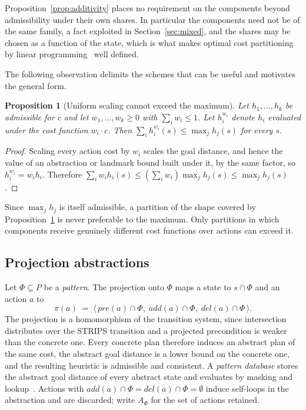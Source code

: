 \documentclass[10pt,twocolumn,a4paper]{article}
\theoremstyle{plain}
\newtheorem{proposition}[theorem]{Proposition}
\theoremstyle{definition}
\theoremstyle{remark}
\newcommand{\pre}{\mathit{pre}}
\newcommand{\add}{\mathit{add}}
\newcommand{\del}{\mathit{del}}
\newcommand{\proj}{\pi}
\begin{document}
Proposition~\ref{prop:additivity} places no requirement on the components
beyond admissibility under their own shares. In particular the components need
not be of the same family, a fact exploited in Section~\ref{sec:mixed}, and the
shares may be chosen as a function of the state, which is what makes optimal
cost partitioning by linear programming~\cite{katz2008,pommerening2014} well
defined.

The following observation delimits the schemes that can be useful and motivates
the general form.

\begin{proposition}[Uniform scaling cannot exceed the maximum]
\label{prop:scaling}
Let $h_1, \dots, h_k$ be admissible for $c$ and let $w_1, \dots, w_k \ge 0$
with $\sum_i w_i \le 1$. Let $h_i^{w_i}$ denote $h_i$ evaluated under the cost
function $w_i \cdot c$. Then
$\sum_i h_i^{w_i}(s) \le \max_j h_j(s)$ for every $s$.
\end{proposition}

\begin{proof}
Scaling every action cost by $w_i$ scales the goal distance, and hence the
value of an abstraction or landmark bound built under it, by the same factor,
so $h_i^{w_i} = w_i h_i$. Therefore
$\sum_i w_i h_i(s) \le (\sum_i w_i) \max_j h_j(s) \le \max_j h_j(s)$.
\end{proof}

Since $\max_j h_j$ is itself admissible, a partition of the shape covered by
Proposition~\ref{prop:scaling} is never preferable to the maximum. Only
partitions in which components receive genuinely different cost functions over
actions can exceed it.

\subsection{Projection abstractions}

Let $\Phi \subseteq P$ be a \emph{pattern}. The projection onto $\Phi$ maps a
state to $s \cap \Phi$ and an action $a$ to
\[
  \proj(a) \;=\; \langle\, \pre(a) \cap \Phi,\; \add(a) \cap \Phi,\;
                          \del(a) \cap \Phi \,\rangle .
\]
The projection is a homomorphism of the transition system, since intersection
distributes over the STRIPS transition and a projected precondition is weaker
than the concrete one. Every concrete plan therefore induces an abstract plan
of the same cost, the abstract goal distance is a lower bound on the concrete
one, and the resulting heuristic is admissible and consistent. A \emph{pattern
database} stores the abstract goal distance of every abstract state and
evaluates by masking and lookup~\cite{culberson1998,edelkamp2001}. Actions
with $\add(a) \cap \Phi = \del(a) \cap \Phi = \emptyset$ induce self-loops in
the abstraction and are discarded; write $A_\Phi$ for the set of actions
retained.
\end{document}
